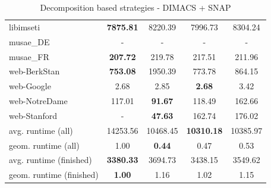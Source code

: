 \documentclass[a4paper,UKenglish,cleveref, autoref, thm-restate]{lipics-v2021}
\begin{document}
\begin{table}
\begin{center}
\begin{tabular}{|l|c|c|c|c|}
			libimseti & \textbf{7875.81} & 8220.39 & 7996.73 & 8304.24 \\
			musae\_DE & - & - & - & - \\
			musae\_FR & \textbf{207.72} & 219.78 & 217.51 & 211.96 \\
			web-BerkStan & \textbf{753.08} & 1950.39 & 773.78 & 864.15 \\
			web-Google & 2.68 & 2.85 & \textbf{2.68} & 3.42 \\
			web-NotreDame & 117.01 & \textbf{91.67} & 118.49 & 162.66 \\
			web-Stanford & - & \textbf{47.63} & 162.74 & 176.02 \\
			\hline
			avg. runtime (all) & 14253.56 & 10468.45 & \textbf{10310.18} & 10385.97 \\
			geom. runtime (all) & 1.00 & \textbf{0.44} & 0.47 & 0.53 \\
			avg. runtime (finished) & \textbf{3380.33} & 3694.73 & 3438.15 & 3549.62 \\
			geom. runtime (finished) & \textbf{1.00} & 1.16 & 1.02 & 1.15 \\
			\hline
		\end{tabular}
	\end{center}
	\caption{Decomposition based strategies - DIMACS + SNAP}
\end{table}
\end{document}
